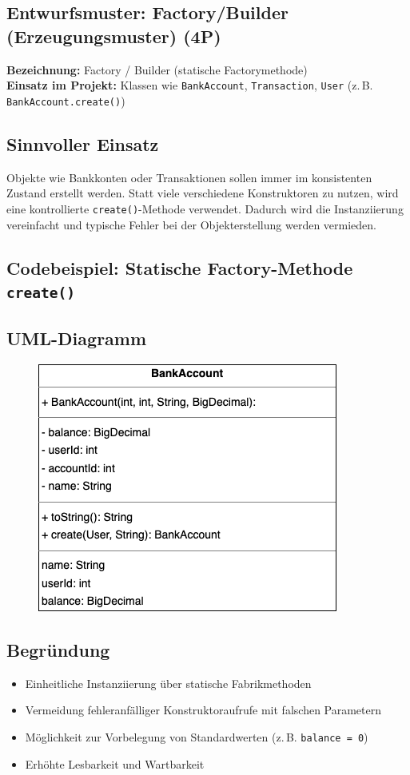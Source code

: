 \subsection{Entwurfsmuster: Factory/Builder (Erzeugungsmuster) (4P)}

\textbf{Bezeichnung:} Factory / Builder (statische Factorymethode) \\
\textbf{Einsatz im Projekt:} Klassen wie \texttt{BankAccount}, \texttt{Transaction}, \texttt{User} (z.\,B. \texttt{BankAccount.create()})

\subsection*{Sinnvoller Einsatz}
Objekte wie Bankkonten oder Transaktionen sollen immer im konsistenten Zustand erstellt werden.
Statt viele verschiedene Konstruktoren zu nutzen, wird eine kontrollierte \texttt{create()}-Methode verwendet.
Dadurch wird die Instanziierung vereinfacht und typische Fehler bei der Objekterstellung werden vermieden.


\subsection*{Codebeispiel: Statische Factory-Methode \texttt{create()}}



\subsection*{UML-Diagramm}
\begin{figure}[htbp]
    \centering
    \includegraphics[width=0.6\linewidth]
    {kapitel8_entwurfsmuster/UMLs/BankAccount.drawio.png}
\end{figure}

\subsection*{Begründung}
\begin{itemize}
    \item Einheitliche Instanziierung über statische Fabrikmethoden
    \item Vermeidung fehleranfälliger Konstruktoraufrufe mit falschen Parametern
    \item Möglichkeit zur Vorbelegung von Standardwerten (z.\,B. \texttt{balance = 0})
    \item Erhöhte Lesbarkeit und Wartbarkeit
\end{itemize}